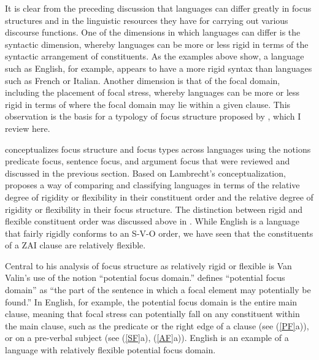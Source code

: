 It is clear from the preceding discussion that languages can differ greatly in focus structures and in the linguistic resources they have for carrying out various discourse functions. One of the dimensions in which languages can differ is the syntactic dimension, whereby languages can be more or less rigid in terms of the syntactic arrangement of constituents. As the examples above show, a language such as English, for example, appears to have a more rigid syntax than languages such as French or Italian. Another dimension is that of the focal domain, including the placement of focal stress, whereby languages can be more or less rigid in terms of where the focal domain may lie within a given clause. This observation is the basis for a typology of focus structure proposed by \citet{vanvalin1999}, which I review here. 

\citet{lambrecht1994} conceptualizes focus structure and focus types across languages using the notions predicate focus, sentence focus, and argument focus that were reviewed and discussed in the previous section. Based on Lambrecht's conceptualization, \citet{vanvalin1999} proposes a way of comparing and classifying languages in terms of the relative degree of rigidity or flexibility in their constituent order and the relative degree of rigidity or flexibility in their focus structure. The distinction between rigid and flexible constituent order was discussed above in . While English is a language that fairly rigidly conforms to an S-V-O order, we have seen that the constituents of a ZAI clause are relatively flexible.

Central to his analysis of focus structure as relatively rigid or flexible is Van Valin's use of the notion ``potential focus domain.'' \citet[513]{vanvalin1999} defines ``potential focus domain'' as ``the part of the sentence in which a focal element may potentially be found.'' In English, for example, the potential focus domain is the entire main clause, meaning that focal stress can potentially fall on any constituent within the main clause, such as the predicate or the right edge of a clause (see (\ref{PF}a)), or on a pre-verbal subject (see (\ref{SF}a), (\ref{AF}a)). English is an example of a language with relatively flexible potential focus domain. 

